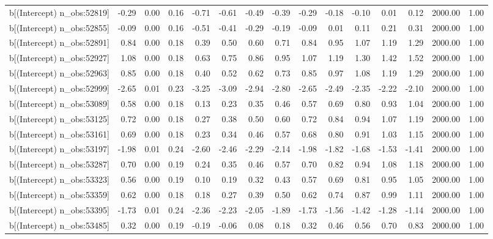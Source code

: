 \begin{table}[ht]
\begin{tabular}{rrrrrrrrrrrrrrr}
  b[(Intercept) n\_obs:52819] & -0.29 & 0.00 & 0.16 & -0.71 & -0.61 & -0.49 & -0.39 & -0.29 & -0.18 & -0.10 & 0.01 & 0.12 & 2000.00 & 1.00 \\ 
  b[(Intercept) n\_obs:52855] & -0.09 & 0.00 & 0.16 & -0.51 & -0.41 & -0.29 & -0.19 & -0.09 & 0.01 & 0.11 & 0.21 & 0.31 & 2000.00 & 1.00 \\ 
  b[(Intercept) n\_obs:52891] & 0.84 & 0.00 & 0.18 & 0.39 & 0.50 & 0.60 & 0.71 & 0.84 & 0.95 & 1.07 & 1.19 & 1.29 & 2000.00 & 1.00 \\ 
  b[(Intercept) n\_obs:52927] & 1.08 & 0.00 & 0.18 & 0.63 & 0.75 & 0.86 & 0.95 & 1.07 & 1.19 & 1.30 & 1.42 & 1.52 & 2000.00 & 1.00 \\ 
  b[(Intercept) n\_obs:52963] & 0.85 & 0.00 & 0.18 & 0.40 & 0.52 & 0.62 & 0.73 & 0.85 & 0.97 & 1.08 & 1.19 & 1.29 & 2000.00 & 1.00 \\ 
  b[(Intercept) n\_obs:52999] & -2.65 & 0.01 & 0.23 & -3.25 & -3.09 & -2.94 & -2.80 & -2.65 & -2.49 & -2.35 & -2.22 & -2.10 & 2000.00 & 1.00 \\ 
  b[(Intercept) n\_obs:53089] & 0.58 & 0.00 & 0.18 & 0.13 & 0.23 & 0.35 & 0.46 & 0.57 & 0.69 & 0.80 & 0.93 & 1.04 & 2000.00 & 1.00 \\ 
  b[(Intercept) n\_obs:53125] & 0.72 & 0.00 & 0.18 & 0.27 & 0.38 & 0.50 & 0.60 & 0.72 & 0.84 & 0.94 & 1.07 & 1.19 & 2000.00 & 1.00 \\ 
  b[(Intercept) n\_obs:53161] & 0.69 & 0.00 & 0.18 & 0.23 & 0.34 & 0.46 & 0.57 & 0.68 & 0.80 & 0.91 & 1.03 & 1.15 & 2000.00 & 1.00 \\ 
  b[(Intercept) n\_obs:53197] & -1.98 & 0.01 & 0.24 & -2.60 & -2.46 & -2.29 & -2.14 & -1.98 & -1.82 & -1.68 & -1.53 & -1.41 & 2000.00 & 1.00 \\ 
  b[(Intercept) n\_obs:53287] & 0.70 & 0.00 & 0.19 & 0.24 & 0.35 & 0.46 & 0.57 & 0.70 & 0.82 & 0.94 & 1.08 & 1.18 & 2000.00 & 1.00 \\ 
  b[(Intercept) n\_obs:53323] & 0.56 & 0.00 & 0.19 & 0.10 & 0.19 & 0.32 & 0.43 & 0.57 & 0.69 & 0.81 & 0.95 & 1.05 & 2000.00 & 1.00 \\ 
  b[(Intercept) n\_obs:53359] & 0.62 & 0.00 & 0.18 & 0.18 & 0.27 & 0.39 & 0.50 & 0.62 & 0.74 & 0.87 & 0.99 & 1.11 & 2000.00 & 1.00 \\ 
  b[(Intercept) n\_obs:53395] & -1.73 & 0.01 & 0.24 & -2.36 & -2.23 & -2.05 & -1.89 & -1.73 & -1.56 & -1.42 & -1.28 & -1.14 & 2000.00 & 1.00 \\ 
  b[(Intercept) n\_obs:53485] & 0.32 & 0.00 & 0.19 & -0.19 & -0.06 & 0.08 & 0.18 & 0.32 & 0.46 & 0.56 & 0.70 & 0.83 & 2000.00 & 1.00 \\ 

\end{tabular}
\end{table}
